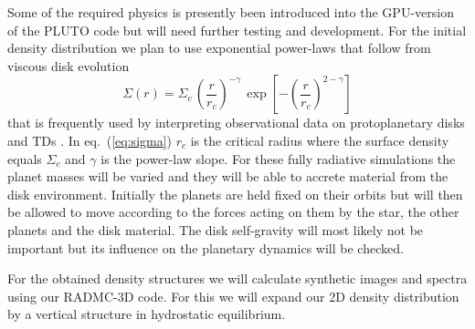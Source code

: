 \documentclass[10pt,fleqn,twoside]{article}
\newcommand{\beq}{\begin{equation}}
\newcommand{\eeq}{\end{equation}}
\begin{document}
\begin{description}
Some of the required physics is presently been introduced into the GPU-version of the PLUTO code but will need 
further testing and development. 
For the initial density distribution we plan to use exponential power-laws that follow from viscous disk evolution
\beq
\label{eq:sigma}
    \Sigma(r) = \Sigma_c \, \left( \frac{r}{r_c} \right)^{-\gamma} \, \exp \left[ - \left(\frac{r}{r_c}\right)^{2 -\gamma} \right] 
\eeq
that is frequently used by interpreting observational data on protoplanetary disks \citep{2011ARA&A..49...67W}
and TDs \citep[see e.g.][]{2015A&A...579A.106V}.
In eq.~(\ref{eq:sigma}) $r_c$ is the critical radius where the surface density equals $\Sigma_c$ and
$\gamma$ is the power-law slope.
For these fully radiative simulations the planet masses will be varied and they will be able
to accrete material from the disk environment. Initially the planets are held fixed on their orbits but will
then be allowed to move according to the forces acting on them by the star, the other planets and the disk material.
The disk self-gravity will most likely not be important but its influence on the planetary dynamics will be checked.

For the obtained density structures we will calculate synthetic images and spectra using our RADMC-3D code.
For this we will expand our 2D density distribution by a vertical structure in hydrostatic equilibrium.

 


\end{description}
\end{document}

